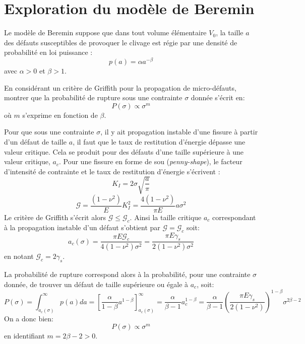 \section{Exploration du modèle de Beremin}

Le modèle de Beremin suppose que dans tout volume élémentaire $V_0$, la taille $a$ des défauts susceptibles
de provoquer le clivage est régie par une densité de probabilité en loi puissance :
\begin{equation}
p(a) = \alpha a^{-\beta}
\end{equation}
avec $\alpha > 0$ et $\beta > 1$.

\begin{questions}
\question En considérant un critère de Griffith pour la propagation de micro-défauts, montrer que la probabilité de rupture sous une contrainte $\sigma$ donnée s'écrit en:
\begin{equation}
P(\sigma) \propto \sigma^m
\end{equation}
où $m$ s'exprime en fonction de $\beta$.

\begin{solution}
Pour que sous une contrainte $\sigma$, il y ait propagation instable d'une fissure à partir d'un défaut de taille $a$, il faut que le taux de restitution d'énergie dépasse une valeur critique. Cela se produit pour des défauts d'une taille supérieure à une valeur critique, $a_c$. Pour une fissure en forme de sou (\textit{penny-shape}), le facteur d'intensité de contrainte et le taux de restitution d'énergie s'écrivent :
$$ K_I = 2\sigma\sqrt{\dfrac{a}{\pi}}$$
$$ \mathcal{G} = \dfrac{(1-\nu^2)}{E}K_I^2 = \dfrac{4(1-\nu^2)}{\pi E}a \sigma^2$$
Le critère de Griffith s'écrit alors $\mathcal{G} \leq \mathcal{G}_c$.
Ainsi la taille critique $a_c$ correspondant à la propagation instable d'un défaut s'obtient par $\mathcal{G} =\mathcal{G}_c$ soit:
$$ a_c(\sigma) = \dfrac{\pi E \mathcal{G}_c}{4(1-\nu^2)\sigma^2} = \dfrac{\pi E \gamma_s}{2(1-\nu^2)\sigma^2} $$
en notant $\mathcal{G}_c = 2\gamma_s$.

La probabilité de rupture correspond alors à la probabilité, pour une contrainte $\sigma$ donnée, de trouver un défaut de taille supérieure ou égale à $a_c$, soit:
$$ P(\sigma) = \int_{a_c(\sigma)}^\infty p(a)da = \left[\dfrac{\alpha}{1-\beta}a^{1-\beta}\right]_{a_c(\sigma)}^\infty = \dfrac{\alpha}{\beta-1}a_c^{1-\beta} = \dfrac{\alpha}{\beta-1}\left(\dfrac{\pi E \gamma_s}{2(1-\nu^2)}\right)^{1-\beta} \sigma^{2\beta-2}$$
On a donc bien:
$$P(\sigma) \propto \sigma^m$$
en identifiant $m=2\beta-2 > 0$.
\end{solution}


\end{questions}
